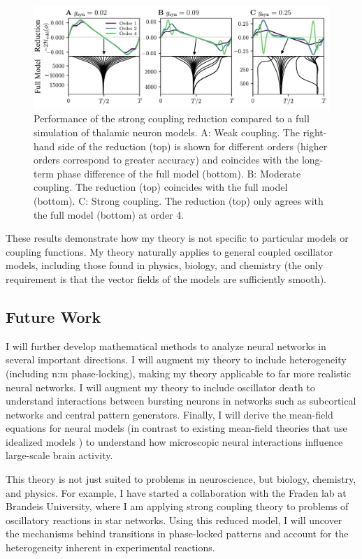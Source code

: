 \documentclass[a4paper,11pt]{article}
\begin{document}
\begin{figure}[ht!]
	\centering
	\includegraphics[width=\textwidth]{figures/thal_h_edited.pdf}
	\caption{Performance of the strong coupling reduction compared to a full simulation of thalamic neuron models. A: Weak coupling. The right-hand side of the reduction (top) is shown for different orders (higher orders correspond to greater accuracy) and coincides with the long-term phase difference of the full model (bottom). B: Moderate coupling. The reduction (top) coincides with the full model (bottom). C: Strong coupling. The reduction (top) only agrees with the full model (bottom) at order 4. }\label{fig:thal}
\end{figure}

These results demonstrate how my theory is not specific to particular models or coupling functions. My theory naturally applies to general coupled oscillator models, including those found in physics, biology, and chemistry (the only requirement is that the vector fields of the models are sufficiently smooth).

\subsection{Future Work}

I will further develop mathematical methods to analyze neural networks in several important directions. I will augment my theory to include heterogeneity (including n:m phase-locking), making my theory applicable to far more realistic neural networks. I will augment my theory to include oscillator death to understand interactions between bursting neurons in networks such as subcortical networks and central pattern generators. Finally, I will derive the mean-field equations for neural models (in contrast to existing mean-field theories that use idealized models \cite{ott2008low}) to understand how microscopic neural interactions influence large-scale brain activity.

This theory is not just suited to problems in neuroscience, but biology, chemistry, and physics. For example, I have started a collaboration with the Fraden lab at Brandeis University, where I am applying strong coupling theory to problems of oscillatory reactions in star networks. Using this reduced model, I will uncover the mechanisms behind transitions in phase-locked patterns and account for the heterogeneity inherent in experimental reactions.
\end{document}
